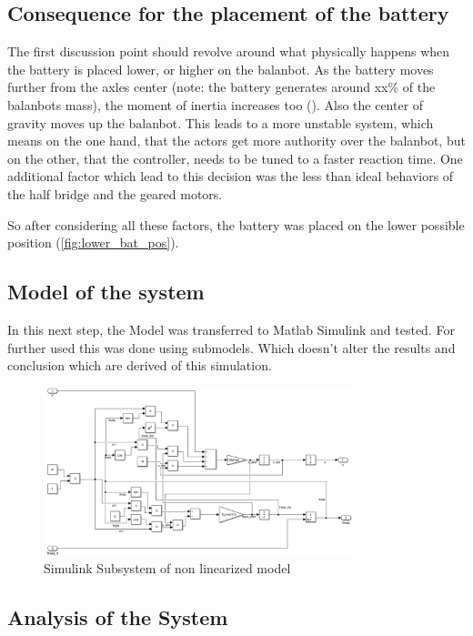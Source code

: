 \subsection{Consequence for the placement of the battery}
The first discussion point should revolve around what physically happens when the battery is placed lower, or higher on the balanbot. As the battery moves further from the axles center (note: the battery generates around xx\% of the balanbots mass), the moment of inertia increases too (\cite{enwiki:satz_von_steiner}). Also the center of gravity moves up the balanbot. This leads to a more unstable system, which means on the one hand, that the actors get more authority over the balanbot, but on the other, that the controller, needs to be tuned to a faster reaction time. One additional factor which lead to this decision was the less than ideal behaviors of the half bridge and the geared motors. 

So after considering all these factors, the battery was placed on the lower possible position (\autoref{fig:lower_bat_pos}).

\subsection{Model of the system}
In this next step, the Model was transferred to Matlab Simulink and tested. For further used this was done using submodels. Which doesn't alter the results and conclusion which are derived of this simulation.
\begin{figure}[H]
    \centering
    \includegraphics[width=0.8\textwidth]{Lab_report/pics/modelBuilding/non_linearized_model.PNG}
    \caption{Simulink Subsystem of non linearized model}
    \label{fig:non_linearized_model}
\end{figure}
\subsection{Analysis of the System}
